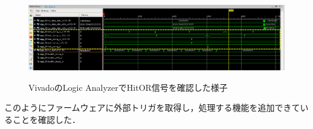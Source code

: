 \begin{figure}[h]
  \centering
  \includegraphics[width=17cm]{./figure/SelfWF.png}
  \label{fig:selfwf}
  \caption{VivadoのLogic AnalyzerでHitOR信号を確認した様子}
\end{figure}


このようにファームウェアに外部トリガを取得し，処理する機能を追加できていることを確認した．






